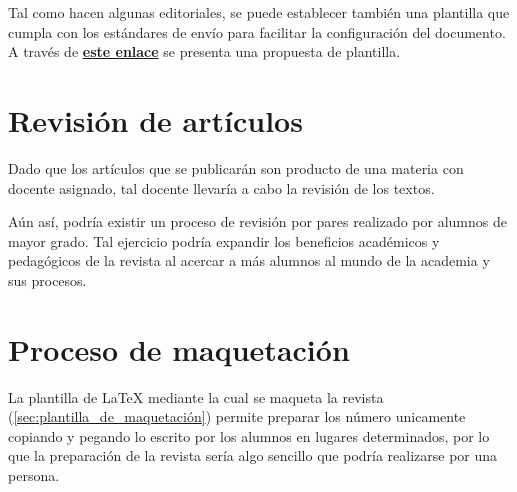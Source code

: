 Tal como hacen algunas editoriales, se puede establecer también una plantilla que cumpla con los estándares de envío para facilitar la configuración del documento. A través de \textbf{\href{https://docs.google.com/document/d/1M7Ag4gmHuryCKiGC0duv6faO6SFfbrNe-7jA6rKuEZ4/edit?usp=sharing}{este enlace}} se presenta una propuesta de plantilla. 

\section{Revisión de artículos}

Dado que los artículos que se publicarán son producto de una materia con docente asignado, tal docente llevaría a cabo la revisión de los textos.

Aún así, podría existir un proceso de revisión por pares realizado por alumnos de mayor grado. Tal ejercicio podría expandir los beneficios académicos y pedagógicos de la revista al acercar a más alumnos al mundo de la academia y sus procesos.

\section{Proceso de maquetación}

La plantilla de LaTeX mediante la cual se maqueta la revista (\autoref{sec:plantilla_de_maquetación}) permite preparar los número unicamente copiando y pegando lo escrito por los alumnos en lugares determinados, por lo que la preparación de la revista sería algo sencillo que podría realizarse por una persona.